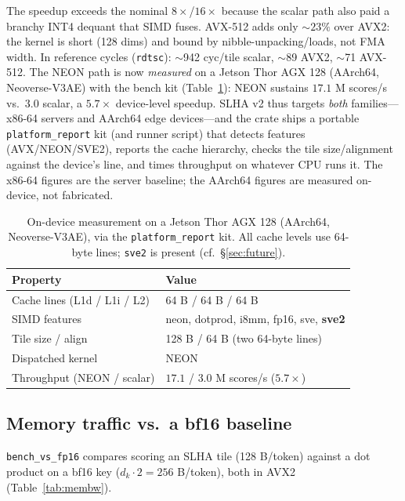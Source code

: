 \documentclass[11pt]{article}
\theoremstyle{plain}
\theoremstyle{definition}
\newcommand{\dk}{d_k}
\begin{document}
The speedup exceeds the nominal $8\times$/$16\times$ because the scalar
path also paid a branchy INT4 dequant that SIMD fuses. AVX-512 adds only
$\sim\!23\%$ over AVX2: the kernel is short (128 dims) and bound by
nibble-unpacking/loads, not FMA width. In reference cycles
(\texttt{rdtsc}): $\sim$942 cyc/tile scalar, $\sim$89 AVX2, $\sim$71
AVX-512. The NEON path is now \emph{measured} on a Jetson Thor AGX 128
(AArch64, Neoverse-V3AE) with the bench kit (Table~\ref{tab:thor}): NEON
sustains $17.1$ M scores/s vs.\ $3.0$ scalar, a $5.7\times$ device-level
speedup. SLHA v2 thus targets \emph{both} families---x86-64 servers and
AArch64 edge devices---and the crate ships a portable
\texttt{platform\_report} kit (and runner script) that detects features
(AVX/NEON/SVE2), reports the cache hierarchy, checks the tile size/alignment
against the device's line, and times throughput on whatever CPU runs it. The
x86-64 figures are the server baseline; the AArch64 figures are measured
on-device, not fabricated.

\begin{table}[t]
\centering
\caption{On-device measurement on a Jetson Thor AGX 128 (AArch64,
Neoverse-V3AE), via the \texttt{platform\_report} kit. All cache levels use
64-byte lines; \texttt{sve2} is present (cf.\ \S\ref{sec:future}).}
\label{tab:thor}
\small
\begin{tabular}{@{}ll@{}}
\toprule
Property & Value \\
\midrule
Cache lines (L1d / L1i / L2) & 64 B / 64 B / 64 B \\
SIMD features                & neon, dotprod, i8mm, fp16, sve, \textbf{sve2} \\
Tile size / align            & 128 B / 64 B (two 64-byte lines) \\
Dispatched kernel            & NEON \\
Throughput (NEON / scalar)   & $17.1$ / $3.0$ M scores/s ($\mathbf{5.7\times}$) \\
\bottomrule
\end{tabular}
\end{table}

\subsection{Memory traffic vs.\ a bf16 baseline}
\label{sec:membw}
\texttt{bench\_vs\_fp16} compares scoring an SLHA tile (128 B/token)
against a dot product on a bf16 key ($\dk \cdot 2 = 256$ B/token), both
in AVX2 (Table~\ref{tab:membw}).
\end{document}
